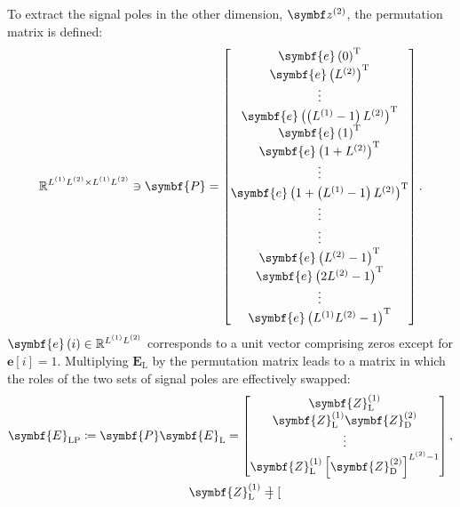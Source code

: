 {To extract the signal poles in the other dimension, $\bdztwo$, the permutation
matrix is defined:
\begin{equation}
    \mathbb{R}^{\Lone \Ltwo \times \Lone \Ltwo} \ni
    \symbf{P} =
    \begin{bmatrix}
        \symbf{e}\left(0\right)\T \\
        \symbf{e}\left(\Ltwo\right)\T \\
        \vdots \\
        \symbf{e}\left(\left(\Lone - 1\right)\Ltwo\right)\T \\
        \symbf{e}\left(1\right)\T \\
        \symbf{e}\left(1 + \Ltwo\right)\T \\
        \vdots \\
        \symbf{e}\left(1 + \left(\Lone - 1\right)\Ltwo\right)\T \\
        \vdots \\
        \vdots \\
        \symbf{e}\left(\Ltwo - 1\right)\T \\
        \symbf{e}\left(2\Ltwo - 1\right)\T \\
        \vdots \\
        \symbf{e}\left(\Lone \Ltwo - 1\right)\T \\
    \end{bmatrix}.
\end{equation}
$\symbf{e}\left(i\right) \in \mathbb{R}^{\Lone \Ltwo}$ corresponds to a unit
vector comprising zeros except for $\symbf{e}\left[i\right] = 1$.
Multiplying $\symbf{E}_{\text{L}}$ by the permutation matrix leads to a matrix
in which the roles of the two sets of signal poles are effectively swapped:
\begin{subequations}
    \begin{gather}
        \symbf{E}_{\text{LP}} \coloneq \symbf{P} \symbf{E}_{\text{L}} =
        \begin{bmatrix}
            \symbf{Z}^{(1)}_{\text{L}} \\
            \symbf{Z}^{(1)}_{\text{L}} \symbf{Z}^{(2)}_{\text{D}} \\
            \vdots \\
            \symbf{Z}^{(1)}_{\text{L}} \left[\symbf{Z}^{(2)}_{\text{D}}\right]^{\Ltwo - 1} \\
        \end{bmatrix},\label{eq:ELP}\\
        \symbf{Z}^{(1)}_{\text{L}} =
        \begin{bmatrix}

\end{bmatrix}
\end{gather}
\end{subequations}}
